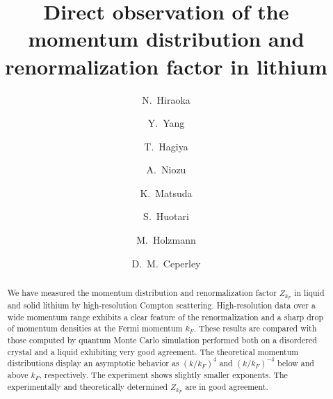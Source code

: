 \documentclass[twocolumn,showpacs,showkeys,fleqn,prl,superscriptaddress]{revtex4}%
\begin{document}

\title{
Direct observation of the momentum distribution and renormalization factor in lithium
}

\author{ 
N.~Hiraoka
}

\author{ 
Y.~Yang
}

\author{ 
T.~Hagiya
}
  
\author{ 
A.~Niozu
}

\author{ 
K.~Matsuda
}

\author{ 
S.~Huotari
}


\author{ 
M.~Holzmann
}

\author{ 
D.~M.~Ceperley
}


\date{}
\begin{abstract}

We have measured the momentum distribution and  renormalization factor $Z_{k_F}$ in liquid and solid lithium by high-resolution Compton scattering.
High-resolution data over a wide momentum range exhibits a clear feature of the renormalization and a sharp drop of momentum densities at the Fermi momentum $k_F$.
These results are compared with those computed by quantum Monte Carlo simulation performed both on a disordered crystal and a  liquid exhibiting very good agreement.        
The theoretical momentum distributions display an asymptotic behavior as $(k/k_F)^4$ and $(k/k_F)^{-4}$ below and above $k_F$, respectively.
The experiment shows slightly smaller exponents. 
The experimentally and theoretically determined $Z_{k_F}$ are in good agreement.


\end{abstract}
\maketitle
\end{document}
